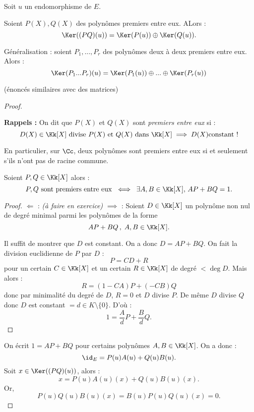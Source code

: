 \documentclass[class=report,crop=false]{standalone}
\newcommand{\exoo}{\emph{(à faire en exercice)}}
\begin{document}
\begin{lemme}
Soit $u$ un endomorphisme de $E$.

Soient $P(X), Q(X)$ des polynômes premiers entre eux. ALors :
\[\Ker ((PQ)(u)) = \Ker (P(u)) \oplus \Ker (Q(u)) .\]

Généralisation : soient $P_1,...,P_r$ des polynômes deux à deux premiers entre eux. Alors :
\[\Ker (P_1...P_r)(u) = \Ker(P_1(u)) \oplus ... \oplus \Ker (P_r(u)) \]

(énoncés similaires avec des matrices)
\end{lemme}
\begin{proof}
\begin{remarque*}

{\bf Rappels : } On dit que $P(X)$ et $Q(X)$ sont {\it premiers entre eux} si :
\[D(X) \in \Kk[X] \mbox{ divise } P(X) \text{ et } Q(X) \mbox{ dans }\Kk[X] \implies D(X) \mbox{constant !}\]

En particulier, sur $\Cc$, deux polynômes sont premiers entre eux si et seulement s'ils n'ont pas de racine commune.

\begin{proposition}
Soient $P,Q \in \Kk[X]$ alors :
\[P,Q \mbox{ sont premiers entre eux } \iff \; \exists A,B \in \Kk[X],\, AP + BQ =1 .\]
\end{proposition}
\begin{proof}
{\boldmath $\Leftarrow$ :} \exoo
{\boldmath $\implies$ :} Soient $D \in \Kk[X]$ un polynôme non nul de degré minimal parmi les polynômes de la forme \[AP + BQ \,,\; A,B \in \Kk[X] .\]

Il suffit de montrer que $D$ est constant. On a donc $D=AP + BQ$. On fait la division euclidienne de $P$ par $D$ :
\[P= CD+R \]
pour un certain $C \in \Kk[X]$ et un certain $R \in \Kk[X]$ de degré $< \deg D$. Mais alors :
\[R = (1-CA)P +(-CB)Q\]
donc par minimalité du degré de $D$, $R= 0$ et $D$ divise $P$. De même $D$ divise $Q$ donc $D$ est constant $ =d \in K\setminus\{0\}$. D'où :
\[1 = \frac{A}{d}P+\frac{B}{d}Q .\]
\end{proof}
\end{remarque*}





On écrit $1 = AP+BQ$ pour certains polynômes $A,B \in \Kk[X]$. On a donc :
\[\id_E = P(u)A(u)+ Q(u)B(u) .\]
Soit $x \in \Ker((PQ)(u))$, alors : \[x = P(u)A(u)(x) + Q(u)B(u)(x) .\] Or, \[P(u)Q(u)B(u)(x) = B(u)P(u)Q(u)(x) = 0.\]


\end{proof}
\end{document}
